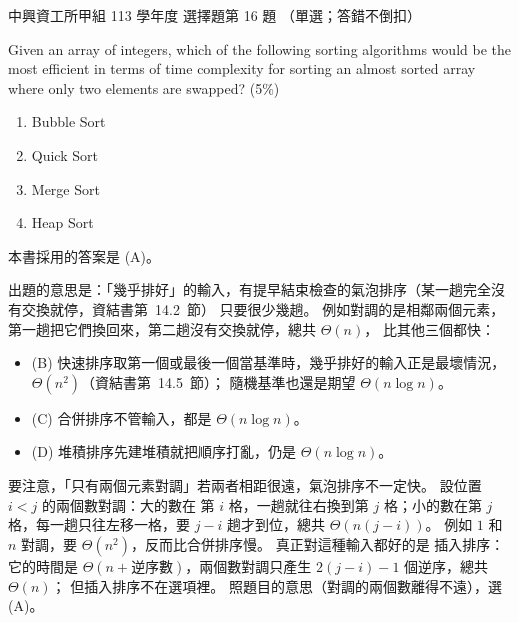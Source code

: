 \begin{pastexam}[label={px:nchu-113-dsa-16}]{中興資工所甲組 113 學年度 選擇題第 16 題}
（單選；答錯不倒扣）

Given an array of integers, which of the following sorting algorithms would be the most efficient in terms
of time complexity for sorting an almost sorted array where only two elements are swapped? (5\%)
\begin{enumerate}[label=(\Alph*)]
\item Bubble Sort
\item Quick Sort
\item Merge Sort
\item Heap Sort
\end{enumerate}
\end{pastexam}

\begin{pastsoln}
本書採用的答案是 (A)。

出題的意思是：「幾乎排好」的輸入，有提早結束檢查的氣泡排序（某一趟完全沒有交換就停，資結書第~14.2~節）
只要很少幾趟。 例如對調的是相鄰兩個元素，第一趟把它們換回來，第二趟沒有交換就停，總共 $\Theta(n)$，
比其他三個都快：
\begin{itemize}
\item (B) 快速排序取第一個或最後一個當基準時，幾乎排好的輸入正是最壞情況，$\Theta(n^2)$（資結書第~14.5~節）；
隨機基準也還是期望 $\Theta(n \log n)$。
\item (C) 合併排序不管輸入，都是 $\Theta(n \log n)$。
\item (D) 堆積排序先建堆積就把順序打亂，仍是 $\Theta(n \log n)$。
\end{itemize}

要注意，「只有兩個元素對調」若兩者相距很遠，氣泡排序不一定快。 設位置 $i < j$ 的兩個數對調：大的數在
第 $i$ 格，一趟就往右換到第 $j$ 格；小的數在第 $j$ 格，每一趟只往左移一格，要 $j - i$ 趟才到位，總共
$\Theta(n(j - i))$。 例如 $1$ 和 $n$ 對調，要 $\Theta(n^2)$，反而比合併排序慢。 真正對這種輸入都好的是
插入排序：它的時間是 $\Theta(n + \text{逆序數})$，兩個數對調只產生 $2(j - i) - 1$ 個逆序，總共 $\Theta(n)$；
但插入排序不在選項裡。 照題目的意思（對調的兩個數離得不遠），選 (A)。
\end{pastsoln}
